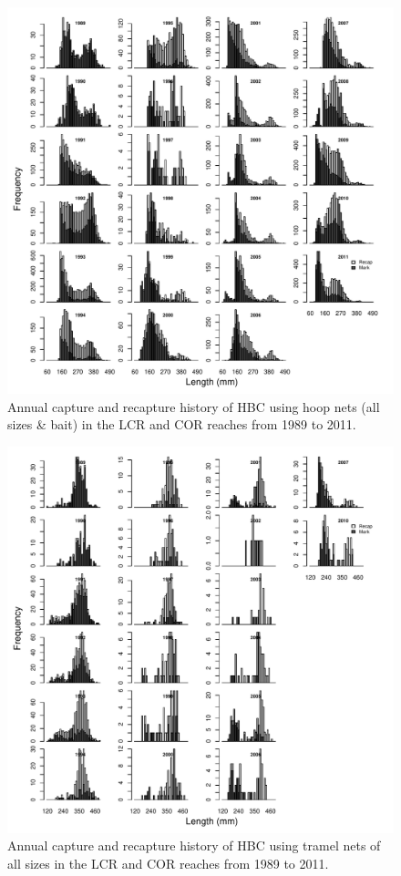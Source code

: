 \begin{figure}[htbp]
	\centering
		\includegraphics[width=6.5in]{../FIGS/LSMR/fig:MarksAtLengthHOOP.pdf}
	\caption{Annual capture and recapture history of HBC using hoop nets (all sizes \& bait) in the LCR and COR reaches from 1989 to 2011.}
	\label{fig:FIGS_LSMR_fig:MarksAtLengthHOOP}
\end{figure}

\begin{figure}[htbp]
	\centering
		\includegraphics[width=6.5in]{../FIGS/LSMR/fig:MarksAtLengthGILL.pdf}
	\caption{Annual capture and recapture history of HBC using tramel nets of all sizes in the LCR and COR reaches from 1989 to 2011.}
	\label{fig:FIGS_LSMR_fig:MarksAtLengthGILL}
\end{figure}


